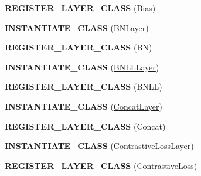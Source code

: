 \begin{DoxyCompactItemize}
\item 
{\bfseries R\+E\+G\+I\+S\+T\+E\+R\+\_\+\+L\+A\+Y\+E\+R\+\_\+\+C\+L\+A\+SS} (Bias)\hypertarget{namespacecaffe_a0e4d9cbd0bee1832083685596e3b0281}{}\label{namespacecaffe_a0e4d9cbd0bee1832083685596e3b0281}

\item 
{\bfseries I\+N\+S\+T\+A\+N\+T\+I\+A\+T\+E\+\_\+\+C\+L\+A\+SS} (\hyperlink{classcaffe_1_1BNLayer}{B\+N\+Layer})\hypertarget{namespacecaffe_a83c75cef3bc910bd3a944b4c93a3a931}{}\label{namespacecaffe_a83c75cef3bc910bd3a944b4c93a3a931}

\item 
{\bfseries R\+E\+G\+I\+S\+T\+E\+R\+\_\+\+L\+A\+Y\+E\+R\+\_\+\+C\+L\+A\+SS} (BN)\hypertarget{namespacecaffe_a354e6aed46c1198e4bbfeccb7f45dd88}{}\label{namespacecaffe_a354e6aed46c1198e4bbfeccb7f45dd88}

\item 
{\bfseries I\+N\+S\+T\+A\+N\+T\+I\+A\+T\+E\+\_\+\+C\+L\+A\+SS} (\hyperlink{classcaffe_1_1BNLLLayer}{B\+N\+L\+L\+Layer})\hypertarget{namespacecaffe_a301bc2174de79871a19fb90bb561791b}{}\label{namespacecaffe_a301bc2174de79871a19fb90bb561791b}

\item 
{\bfseries R\+E\+G\+I\+S\+T\+E\+R\+\_\+\+L\+A\+Y\+E\+R\+\_\+\+C\+L\+A\+SS} (B\+N\+LL)\hypertarget{namespacecaffe_a29bf932e1351a44251e4007f4117b19f}{}\label{namespacecaffe_a29bf932e1351a44251e4007f4117b19f}

\item 
{\bfseries I\+N\+S\+T\+A\+N\+T\+I\+A\+T\+E\+\_\+\+C\+L\+A\+SS} (\hyperlink{classcaffe_1_1ConcatLayer}{Concat\+Layer})\hypertarget{namespacecaffe_ae8385127f2ec655c3d3a56dc238d72c6}{}\label{namespacecaffe_ae8385127f2ec655c3d3a56dc238d72c6}

\item 
{\bfseries R\+E\+G\+I\+S\+T\+E\+R\+\_\+\+L\+A\+Y\+E\+R\+\_\+\+C\+L\+A\+SS} (Concat)\hypertarget{namespacecaffe_ac4f36be9b1ba4f7f748d6b85115d0280}{}\label{namespacecaffe_ac4f36be9b1ba4f7f748d6b85115d0280}

\item 
{\bfseries I\+N\+S\+T\+A\+N\+T\+I\+A\+T\+E\+\_\+\+C\+L\+A\+SS} (\hyperlink{classcaffe_1_1ContrastiveLossLayer}{Contrastive\+Loss\+Layer})\hypertarget{namespacecaffe_a78c9a46f39e49ea79313fbf2b4856752}{}\label{namespacecaffe_a78c9a46f39e49ea79313fbf2b4856752}

\item 
{\bfseries R\+E\+G\+I\+S\+T\+E\+R\+\_\+\+L\+A\+Y\+E\+R\+\_\+\+C\+L\+A\+SS} (Contrastive\+Loss)\hypertarget{namespacecaffe_aa1ef53751e9eed93b3e97eaadefc616a}{}\label{namespacecaffe_aa1ef53751e9eed93b3e97eaadefc616a}


\end{DoxyCompactItemize}
